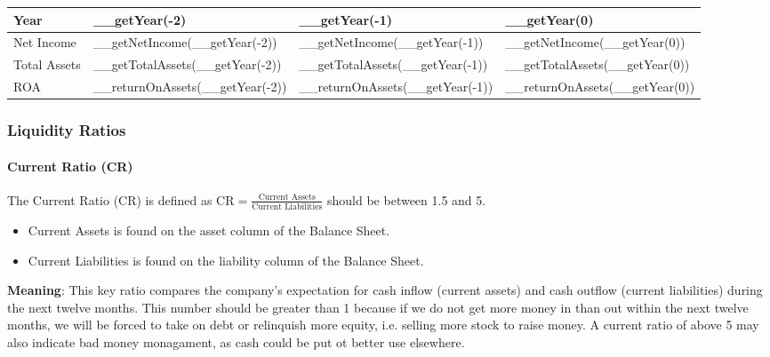 \begin{tabularx}{\textwidth}{|X|X|X|X|}
 \hline
 Year                     & __getYear(-2)                   & __getYear(-1)                   & __getYear(0)                   \\
 \hline
 Net Income               & __getNetIncome(__getYear(-2))   & __getNetIncome(__getYear(-1))   & __getNetIncome(__getYear(0))   \\
 Total Assets             & __getTotalAssets(__getYear(-2)) & __getTotalAssets(__getYear(-1)) & __getTotalAssets(__getYear(0)) \\
 \rowcolor{lightgray} ROA & __returnOnAssets(__getYear(-2)) & __returnOnAssets(__getYear(-1)) & __returnOnAssets(__getYear(0)) \\
 \hline
\end{tabularx}

\subsubsection{Liquidity Ratios}

\paragraph{Current Ratio (CR)}

The Current Ratio (CR) is defined as
$\text{CR} = \frac{\text{Current Assets}}{\text{Current Liabilities}}$ should be
between 1.5 and 5.
\begin{itemize}
    \item Current Assets is found on the asset column of the Balance Sheet.
    \item Current Liabilities is found on the liability column of the Balance Sheet.
\end{itemize}
\textbf{Meaning}: This key ratio compares the company's expectation for cash inflow
(current assets) and cash outflow (current liabilities) during the next twelve
months. This number should be greater than 1 because if we do not get more money
in than out within the next twelve months, we will be forced to take on debt or
relinquish more equity, i.e. selling more stock to raise money. A current ratio
of above 5 may also indicate bad money monagament, as cash could be put ot better
use elsewhere.\\

